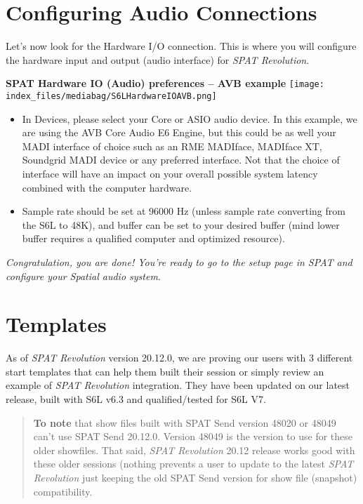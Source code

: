 \documentclass[
  letterpaper,
  DIV=11,
  numbers=noendperiod]{scrreport}
\begin{document}
\hypertarget{configuring-audio-connections}{%
\section{Configuring Audio
Connections}\label{configuring-audio-connections}}

Let's now look for the Hardware I/O connection. This is where you will
configure the hardware input and output (audio interface) for \emph{SPAT
Revolution}.

\textbf{SPAT Hardware IO (Audio) preferences -- AVB example}
\texttt{[image: index\_files/mediabag/S6LHardwareIOAVB.png]}

\begin{itemize}
\item
  In Devices, please select your Core or ASIO audio device. In this
  example, we are using the AVB Core Audio E6 Engine, but this could be
  as well your MADI interface of choice such as an RME MADIface,
  MADIface XT, Soundgrid MADI device or any preferred interface. Not
  that the choice of interface will have an impact on your overall
  possible system latency combined with the computer hardware.
\item
  Sample rate should be set at 96000 Hz (unless sample rate converting
  from the S6L to 48K), and buffer can be set to your desired buffer
  (mind lower buffer requires a qualified computer and optimized
  resource).
\end{itemize}

\emph{Congratulation, you are done! You're ready to go to the setup page
in SPAT and configure your Spatial audio system.}

\hypertarget{templates-4}{%
\section{Templates}\label{templates-4}}

As of \emph{SPAT Revolution} version 20.12.0, we are proving our users
with 3 different start templates that can help them built their session
or simply review an example of \emph{SPAT Revolution} integration. They
have been updated on our latest release, built with S6L v6.3 and
qualified/tested for S6L V7.

\begin{quote}
\textbf{To note} that show files built with SPAT Send version 48020 or
48049 can't use SPAT Send 20.12.0. Version 48049 is the version to use
for these older showfiles. That said, \emph{SPAT Revolution} 20.12
release works good with these older sessions (nothing prevents a user to
update to the latest \emph{SPAT Revolution} just keeping the old SPAT
Send version for show file (snapshot) compatibility.
\end{quote}
\end{document}
